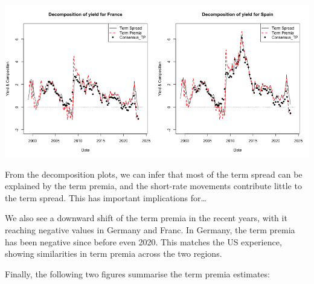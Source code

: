 \documentclass[
]{article}
\begin{document}
\includegraphics[width=0.5\textwidth,height=\textheight]{Plots/Historical/Yield_decomposition_France.png}\includegraphics[width=0.5\textwidth,height=\textheight]{Plots/Historical/Yield_decomposition_Spain.png}

From the decomposition plots, we can infer that most of the term spread
can be explained by the term premia, and the short-rate movements
contribute little to the term spread. This has important implications
for\ldots{}

We also see a downward shift of the term premia in the recent years,
with it reaching negative values in Germany and Franc. In Germany, the
term premia has been negative since before even 2020. This matches the
US experience, showing similarities in term premia across the two
regions. \pagebreak

Finally, the following two figures summarise the term premia estimates:
\end{document}
